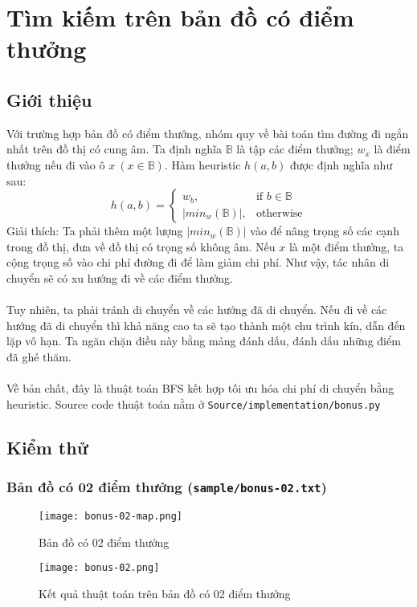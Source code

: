 \documentclass[12pt]{article}
\begin{document}
\section{Tìm kiếm trên bản đồ có điểm thưởng}
\subsection{Giới thiệu}
Với trường hợp bản đồ có điểm thưởng, nhóm quy về bài toán tìm đường đi ngắn nhất trên đồ thị có cung âm. Ta định nghĩa $\mathbb{B}$ là tập các điểm thưởng; $w_x$ là điểm thưởng nếu đi vào ô $x\ (x \in \mathbb{B})$. Hàm heuristic $h(a, b)$ được định nghĩa như sau:
$$
h(a, b) = \begin{cases}
w_b, & \text{if $b \in \mathbb{B}$}\\
|min_w(\mathbb{B})|, & \text{otherwise}
\end{cases}
$$
Giải thích: Ta phải thêm một lượng $|min_w(\mathbb{B})|$ vào để nâng trọng số các cạnh trong đồ thị, đưa về đồ thị có trọng số không âm. Nếu $x$ là một điểm thưởng, ta cộng trọng số vào chi phí đường đi để làm giảm chi phí. Như vậy, tác nhân di chuyển sẽ có xu hướng đi về các điểm thưởng.
\\\\
Tuy nhiên, ta phải tránh di chuyển về các hướng đã di chuyển. Nếu đi về các hướng đã di chuyển thì khả năng cao ta sẽ tạo thành một chu trình kín, dẫn đến lặp vô hạn. Ta ngăn chặn điều này bằng mảng đánh dấu, đánh dấu những điểm đã ghé thăm.
\\\\
Về bản chất, đây là thuật toán BFS kết hợp tối ưu hóa chi phí di chuyển bằng heuristic. Source code thuật toán nằm ở \texttt{Source/implementation/bonus.py}
\subsection{Kiểm thử}
\subsubsection{Bản đồ có 02 điểm thưởng (\texttt{sample/bonus-02.txt})}
\begin{figure}[H]
	\centering
	\texttt{[image: bonus-02-map.png]}
	\caption{Bản đồ có 02 điểm thưởng}
\end{figure}

\begin{figure}[H]
	\centering
	\texttt{[image: bonus-02.png]}
	\caption{Kết quả thuật toán trên bản đồ có 02 điểm thưởng}
\end{figure}
\end{document}
